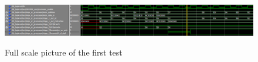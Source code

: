 \begin{figure}[h]
	\caption{Full scale picture of the first test}
	\includegraphics[scale=0.55, angle=90]{figures/tb_toplevel_pc_with_stall.png}
	\label{fig:test-1-landscape}
\end{figure}
